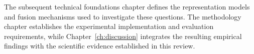 The subsequent technical foundations chapter defines the representation models and fusion mechanisms
used to investigate these questions. The methodology chapter establishes the experimental
implementation and evaluation requirements, while Chapter~\ref{ch:discussion} integrates the
resulting empirical findings with the scientific evidence established in this review.

